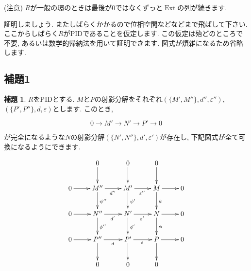 \documentclass{jsarticle}
\newcommand{\makeop}[1]{\mathop{\mathrm{#1}}\nolimits}
\def\Ext{\makeop{Ext}}
\theoremstyle{definition}
\newtheorem{lemma}{補題}
\numberwithin{theorem}{section}
\begin{document}
(注意) $R$が一般の環のときは最後が$0$ではなくずっと$\Ext$の列が続きます.

証明しましょう. またしばらくかかるので位相空間などなどまで飛ばして下さい. ここからしばらく$R$がPIDであることを仮定します.
この仮定は殆どのところで不要, あるいは数学的帰納法を用いて証明できます. 図式が煩雑になるため省略します.

\subsection{補題1}
\begin{lemma}
$R$をPIDとする. $M$と$P$の射影分解をそれぞれ$(\{M', M''\}, d'', \varepsilon'')$, $(\{P', P''\}, d, \varepsilon)$とします.
このとき,

\begin{equation*}
0\rightarrow M' \rightarrow N' \rightarrow P' \rightarrow 0
\end{equation*}

が完全になるような$N$の射影分解$(\{N', N''\}, d', \varepsilon')$が存在し, 下記図式が全て可換になるようにできます.

\begin{equation*}
\xymatrix{
            & 0 \ar[d] &  0 \ar[d] &  0 \ar[d] & \\
  0 \ar[r] & M'' \ar[r]_{d''} \ar[d]^{\psi''} & M' \ar[r]_{\varepsilon''} \ar[d]^{\psi'} & M \ar[r] \ar[d]^{\psi} & 0 \\
  0 \ar[r] & N'' \ar[r]_{d'} \ar[d]^{\phi''} & N' \ar[r]_{\varepsilon'} \ar[d]^{\phi'} & N \ar[r] \ar[d]^{\phi} & 0 \\
  0 \ar[r] & P'' \ar[r]_{d} \ar[d] & P' \ar[r]_{\varepsilon} \ar[d] & P \ar[r] \ar[d] & 0 \\
            & 0 &  0 &  0 & \\
}
\end{equation*}
\end{lemma}
\end{document}
